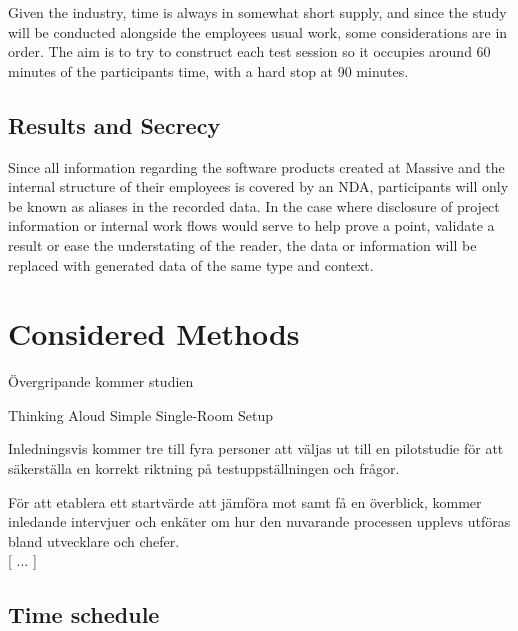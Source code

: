 \documentclass{article}
\begin{document}
    Given the industry, time is always in somewhat short supply, and
    since the study will be conducted alongside the employees usual work, some
    considerations are in order. The aim is to try to construct each test
    session so it occupies around 60 minutes of the participants time, with a
    hard stop at 90 minutes.

  \subsection{Results and Secrecy}

    Since all information regarding the software products created at Massive
    and the internal structure of their employees is covered by an
    NDA\cite{c_nda}, participants will only be known as aliases in the recorded
    data. In the case where disclosure of project information or internal work
    flows would serve to help prove a point, validate a result or ease the
    understating of the reader, the data or information will be replaced with
    generated data of the same type and context.

\section{Considered Methods}

  Övergripande kommer studien

Thinking Aloud \cite[p.204]{c_handbook_usability}
Simple Single-Room Setup \cite[p.101]{c_handbook_usability}

  Inledningsvis kommer tre till fyra personer att väljas ut till en
  pilotstudie för att säkerställa en korrekt riktning på testuppställningen och
  frågor.

  För att etablera ett startvärde att jämföra mot samt få en överblick, kommer
  inledande intervjuer och enkäter om hur den nuvarande processen upplevs
  utföras bland utvecklare och chefer. \\

  [ ... ]






\begin{landscape}
  \section{Time schedule}
  \centering
  
\end{landscape}
\restoregeometry
\end{document}
